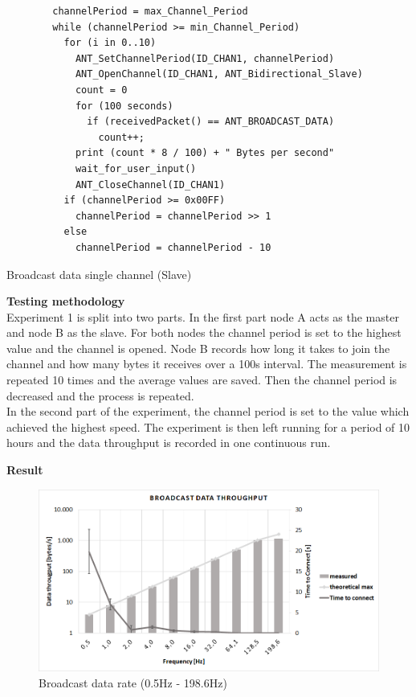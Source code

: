 \begin{description}
	\begin{code}[H]
		\begin{verbatim}
		channelPeriod = max_Channel_Period
		while (channelPeriod >= min_Channel_Period) 
		  for (i in 0..10) 
		    ANT_SetChannelPeriod(ID_CHAN1, channelPeriod)
		    ANT_OpenChannel(ID_CHAN1, ANT_Bidirectional_Slave)
		    count = 0
		    for (100 seconds) 
		      if (receivedPacket() == ANT_BROADCAST_DATA)
		        count++;			  
		    print (count * 8 / 100) + " Bytes per second"
		    wait_for_user_input()
		    ANT_CloseChannel(ID_CHAN1)
		  if (channelPeriod >= 0x00FF)
		    channelPeriod = channelPeriod >> 1
		  else
		    channelPeriod = channelPeriod - 10
		\end{verbatim}
		\caption{Broadcast data single channel (Slave)}\label{lst:sExp1}
	\end{code}	
	\item{\textbf{Testing methodology}} \hfill \\Experiment 1 is split into two parts.
	In the first part node A acts as the master and node B as the slave. For both nodes the channel period is set to the highest value and the channel is opened. Node B records how long it takes to join the channel and how many bytes it receives over a 100s interval. The measurement is repeated 10 times and the average values are saved. Then the channel period is decreased and the process is repeated.\\ 
	In the second part of the experiment, the channel period is set to the value which achieved the highest speed. The experiment is then left running for a period of 10 hours and the data throughput is recorded in one continuous run.
	\item{\textbf{Result}} \hfill \\  
	\begin{figure}[H]
		\centering
		\includegraphics[scale=0.5]{content/images/exp1_norm.png}
		\caption{Broadcast data rate (0.5Hz - 198.6Hz)}\label{fig:exp1norm}
	\end{figure}
	

\end{description}
